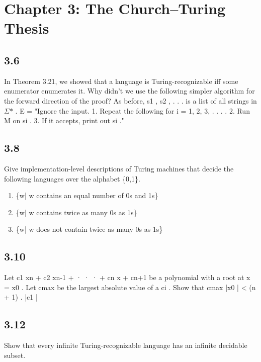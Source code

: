 \section{Chapter 3: The Church--Turing Thesis}

\subsection*{3.6}

In Theorem 3.21, we showed that a language is Turing-recognizable iff some enumerator enumerates it. Why didn't we use the following simpler algorithm for the forward direction of the proof? As before, s1 , s2 , . . . is a list of all strings in $\Sigma$$\ast$ . E = "Ignore the input. 1. Repeat the following for i = 1, 2, 3, . . . . 2. Run M on si . 3. If it accepts, print out si ."


\subsection*{3.8}

Give implementation-level descriptions of Turing machines that decide the following languages over the alphabet \{0,1\}.

\begin{enumerate}[label=(\alph*), leftmargin=2.5em]

\item \{w| w contains an equal number of 0s and 1s\}

\item \{w| w contains twice as many 0s as 1s\}

\item \{w| w does not contain twice as many 0s as 1s\}

\end{enumerate}


\subsection*{3.10}

Let c1 xn + c2 xn-1 + · · · + cn x + cn+1 be a polynomial with a root at x = x0 . Let cmax be the largest absolute value of a ci . Show that cmax |x0 | < (n + 1) . |c1 |


\subsection*{3.12}

Show that every infinite Turing-recognizable language has an infinite decidable subset.


